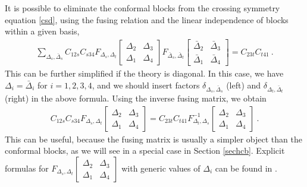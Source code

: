 \documentclass[12pt, a4paper, notitlepage, twoside]{report}
\numberwithin{equation}{section}
\theoremstyle{break}
\begin{document}
It is possible to eliminate the conformal blocks from the crossing symmetry equation \eqref{csd}, using the fusing relation and the linear independence of blocks within a given basis,
\begin{align}
 \sum_{\Delta_s,\bar{\Delta}_s} C_{12s} C_{s34}
F_{\Delta_s,\Delta_t}\begin{bmatrix} \Delta_2 & \Delta_3 \\ \Delta_1 & \Delta_4 \end{bmatrix}
F_{\bar{\Delta}_s,\bar{\Delta}_t}\begin{bmatrix} \bar{\Delta}_2 & \bar{\Delta}_3 \\ \bar{\Delta}_1 & \bar{\Delta}_4 \end{bmatrix}
=  C_{23t}C_{t41}\ .
\end{align}
This can be further simplified if the theory is diagonal.
In this case, we have $\Delta_i=\bar{\Delta}_i$ for $i=1,2,3,4$, and we should insert factors $\delta_{\Delta_s,\bar\Delta_s}$ (left) and $\delta_{\Delta_t,\bar\Delta_t}$ (right) in the above formula.
Using the inverse fusing matrix, we obtain 
\begin{align}
 C_{12s} C_{s34}
F_{\Delta_s,\Delta_t}\begin{bmatrix} \Delta_2 & \Delta_3 \\ \Delta_1 & \Delta_4 \end{bmatrix}
= C_{23t}C_{t41} 
F^{-1}_{\Delta_t,\Delta_s}\begin{bmatrix} \Delta_2 & \Delta_3 \\ \Delta_1 & \Delta_4 \end{bmatrix}
\ .
\end{align}
This can be useful, because the fusing matrix is usually a simpler object than the conformal blocks, as we will see in a special case in Section \ref{sechcb}.
Explicit formulas for $F_{\Delta_s,\Delta_t}\begin{bmatrix} \Delta_2 & \Delta_3 \\ \Delta_1 & \Delta_4 \end{bmatrix}$ with generic values of $\Delta_i$ can be found in \cite{tv12}.
\end{document}
